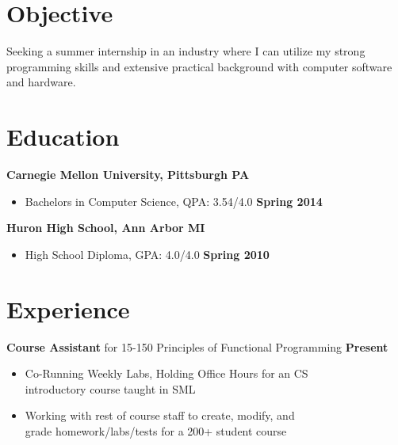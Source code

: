 \documentclass[sectioned]{dsyangres}
\begin{document}

\address{{\bf School Address} \\
  5032 forbes ave. SMC 4932 \\ Pittsburgh, PA 15289  \\
         }
\address{{\bf Home Address} \\
  5313 Betheny Circle \\
  Superior Township, MI 48198 \\
   }


\begin{resume}

\section{Objective}

Seeking a summer internship in an industry where I can utilize my strong programming
skills and extensive practical background with computer software and hardware.


\section{Education}

\textbf{Carnegie Mellon University, Pittsburgh PA}
  \begin{itemize}
    \item Bachelors in Computer Science, QPA: 3.54/4.0 \hfill \textbf{ Spring 2014}
  \end{itemize}
\vspace{-1pt}
\textbf{Huron High School, Ann Arbor MI}
  \begin{itemize}
    \item High School Diploma, GPA: 4.0/4.0 \hfill \textbf{ Spring 2010}
  \end{itemize}


\section{Experience}

\textbf{Course Assistant} for 15-150 Principles of Functional
 Programming \hfill \textbf{Present}
 \begin{itemize} \itemsep -2pt
   \item Co-Running Weekly Labs, Holding Office Hours for an CS\\
     introductory course taught in SML
   \item Working with rest of course staff to create, modify, and\\
     grade homework/labs/tests for a 200+ student course
 \end{itemize}


\end{resume}
\end{document}
